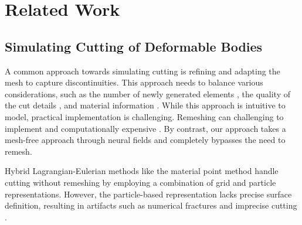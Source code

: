 \section{Related Work}

\subsection{Simulating Cutting of Deformable Bodies}

A common approach towards simulating cutting is refining and adapting the mesh to capture discontinuities. This approach needs to balance various considerations, such as the number of newly generated elements \cite{Bielser:2000:ISSC, Mor:2000:MSTM}, the quality of the cut details \cite{Busaryev:2013:AFS}, and material information \cite{Chen:2014:refine}. While this approach is intuitive to model, practical implementation is challenging. Remeshing can  challenging to implement \cite{zhang2019amrex} and computationally expensive \cite{obiols2023adarnet}. By contrast, our approach takes a mesh-free approach through neural fields and completely bypasses the need to remesh.

Hybrid Lagrangian-Eulerian methods like the material point method \cite{jiang2016material} handle cutting without remeshing by employing a combination of grid and particle representations. However, the particle-based representation lacks precise surface definition, resulting in artifacts such as numerical fractures and imprecise cutting \cite{su2022ulmpm,fan2025hybrid}.



